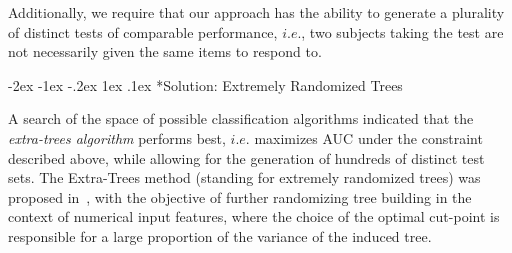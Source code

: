 \documentclass[twocolumn,,9pt]{IEEEtran}
\makeatletter
\renewcommand\section{\@startsection {section}{1}{\z@}%
  {-2ex \@plus -1ex \@minus -.2ex}%
  {1ex \@plus.1ex}%
  {\large\bfseries\scshape}}
\makeatother
\begin{document}
Additionally, we require that our approach has the ability to generate
 a plurality of distinct tests of comparable performance, $i.e.$, two subjects
  taking the test are not necessarily given the same items to respond to.




  \section*{Solution: Extremely Randomized Trees}

  A search of the space of possible classification algorithms indicated that
  the \textit{extra-trees algorithm} performs best, $i.e.$ maximizes AUC under the constraint described above, while allowing for the generation of hundreds of distinct test sets. The Extra-Trees method (standing for extremely randomized trees) was proposed in~\cite{ert06}, with the  objective of further randomizing tree building in the context of numerical input features, where the choice of the optimal cut-point is responsible for a large proportion of the variance of the induced tree.
\end{document}
